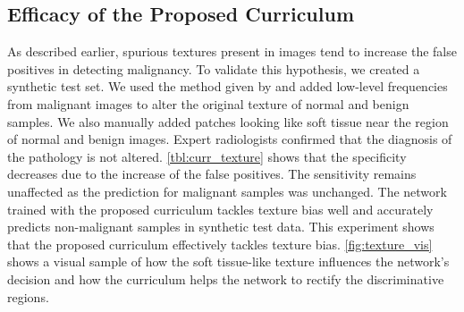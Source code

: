 \subsection{Efficacy of the Proposed Curriculum}
%
As described earlier, spurious textures present in \usg images tend to increase the false positives in detecting malignancy. To validate this hypothesis, we created a synthetic test set. We used the method given by \cite{yang2020fda} and added low-level frequencies from malignant images to alter the original texture of normal and benign samples. We also manually added patches looking like soft tissue near the \gb region of normal and benign images. Expert radiologists confirmed that the diagnosis of the \gb pathology is not altered. \cref{tbl:curr_texture} shows that the specificity decreases due to the increase of the false positives. The sensitivity remains unaffected as the prediction for malignant \gb samples was unchanged. The network trained with the proposed curriculum tackles texture bias well and accurately predicts non-malignant samples in synthetic test data. This experiment shows that the proposed curriculum effectively tackles texture bias. \cref{fig:texture_vis} shows a visual sample of how the soft tissue-like texture influences the network's decision and how the curriculum helps the network to rectify the discriminative regions. 

